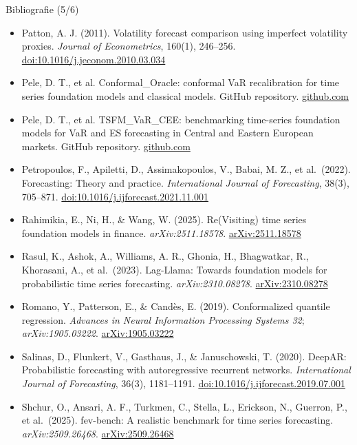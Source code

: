 \begin{frame}{Bibliografie (5/6)}
\itemsize{\tiny}
\begin{itemize}
    \item Patton, A. J. (2011). Volatility forecast comparison using imperfect volatility proxies. \textit{Journal of Econometrics}, 160(1), 246--256. \href{https://doi.org/10.1016/j.jeconom.2010.03.034}{doi:10.1016/j.jeconom.2010.03.034}
    \item Pele, D. T., et al. Conformal\_Oracle: conformal VaR recalibration for time series foundation models and classical models. GitHub repository. \href{https://github.com/danpele/Conformal_Oracle}{github.com}
    \item Pele, D. T., et al. TSFM\_VaR\_CEE: benchmarking time-series foundation models for VaR and ES forecasting in Central and Eastern European markets. GitHub repository. \href{https://github.com/danpele/TSFM_VaR_CEE}{github.com}
    \item Petropoulos, F., Apiletti, D., Assimakopoulos, V., Babai, M. Z., et al.\ (2022). Forecasting: Theory and practice. \textit{International Journal of Forecasting}, 38(3), 705--871. \href{https://doi.org/10.1016/j.ijforecast.2021.11.001}{doi:10.1016/j.ijforecast.2021.11.001}
    \item Rahimikia, E., Ni, H., \& Wang, W. (2025). Re(Visiting) time series foundation models in finance. \textit{arXiv:2511.18578}. \href{https://arxiv.org/abs/2511.18578}{arXiv:2511.18578}
    \item Rasul, K., Ashok, A., Williams, A. R., Ghonia, H., Bhagwatkar, R., Khorasani, A., et al.\ (2023). Lag-Llama: Towards foundation models for probabilistic time series forecasting. \textit{arXiv:2310.08278}. \href{https://arxiv.org/abs/2310.08278}{arXiv:2310.08278}
    \item Romano, Y., Patterson, E., \& Candès, E. (2019). Conformalized quantile regression. \textit{Advances in Neural Information Processing Systems 32}; \textit{arXiv:1905.03222}. \href{https://arxiv.org/abs/1905.03222}{arXiv:1905.03222}
    \item Salinas, D., Flunkert, V., Gasthaus, J., \& Januschowski, T. (2020). DeepAR: Probabilistic forecasting with autoregressive recurrent networks. \textit{International Journal of Forecasting}, 36(3), 1181--1191. \href{https://doi.org/10.1016/j.ijforecast.2019.07.001}{doi:10.1016/j.ijforecast.2019.07.001}
    \item Shchur, O., Ansari, A. F., Turkmen, C., Stella, L., Erickson, N., Guerron, P., et al.\ (2025). fev-bench: A realistic benchmark for time series forecasting. \textit{arXiv:2509.26468}. \href{https://arxiv.org/abs/2509.26468}{arXiv:2509.26468}

\end{itemize}
\end{frame}
